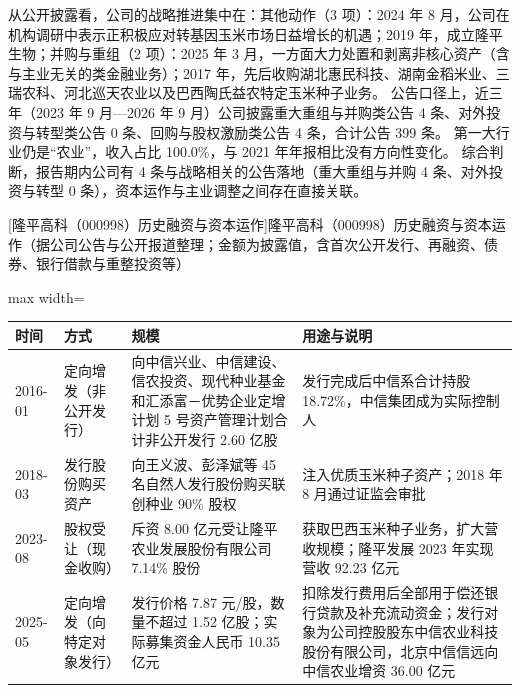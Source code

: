  从公开披露看，公司的战略推进集中在：其他动作（3 项）：2024 年 8 月，公司在机构调研中表示正积极应对转基因玉米市场日益增长的机遇；2019 年，成立隆平生物；并购与重组（2 项）：2025 年 3 月，一方面大力处置和剥离非核心资产（含与主业无关的类金融业务）；2017 年，先后收购湖北惠民科技、湖南金稻米业、三瑞农科、河北巡天农业以及巴西陶氏益农特定玉米种子业务。 公告口径上，近三年（2023 年 9 月---2026 年 9 月）公司披露重大重组与并购类公告 4 条、对外投资与转型类公告 0 条、回购与股权激励类公告 4 条，合计公告 399 条。 第一大行业仍是“农业”，收入占比 100.0\%，与 2021 年年报相比没有方向性变化。 综合判断，报告期内公司有 4 条与战略相关的公告落地（重大重组与并购 4 条、对外投资与转型 0 条），资本运作与主业调整之间存在直接关联。

\begin{center}\small\setlength{\tabcolsep}{4pt}
[隆平高科（000998）历史融资与资本运作]{隆平高科（000998）历史融资与资本运作（据公司公告与公开报道整理；金额为披露值，含首次公开发行、再融资、债券、银行借款与重整投资等）}
\begin{adjustbox}{max width=\textwidth}
\begin{tabular}{@{}p{1.45cm}p{2.55cm}p{4.05cm}p{4.95cm}@{}}
\toprule
时间 & 方式 & 规模 & 用途与说明 \\
\midrule
2016-01 & 定向增发（非公开发行） & 向中信兴业、\allowbreak{}中信建设、\allowbreak{}信农投资、\allowbreak{}现代种业基金和汇添富－优势企业定增计划 5 号资产管理计划合计非公开发行 2.60 亿股 & 发行完成后中信系合计持股 18.72\%，\allowbreak{}中信集团成为实际控制人 \\
2018-03 & 发行股份购买资产 & 向王义波、\allowbreak{}彭泽斌等 45 名自然人发行股份购买联创种业 90\% 股权 & 注入优质玉米种子资产；2018 年 8 月通过证监会审批 \\
2023-08 & 股权受让（现金收购） & 斥资 8.00 亿元受让隆平农业发展股份有限公司 7.14\% 股份 & 获取巴西玉米种子业务，\allowbreak{}扩大营收规模；隆平发展 2023 年实现营收 92.23 亿元 \\
2025-05 & 定向增发（向特定对象发行） & 发行价格 7.87 元/\allowbreak{}股，\allowbreak{}数量不超过 1.52 亿股；实际募集资金人民币 10.35 亿元 & 扣除发行费用后全部用于偿还银行贷款及补充流动资金；发行对象为公司控股股东中信农业科技股份有限公司，\allowbreak{}北京中信信远向中信农业增资 36.00 亿元 \\
\bottomrule
\end{tabular}
\end{adjustbox}
\end{center}

